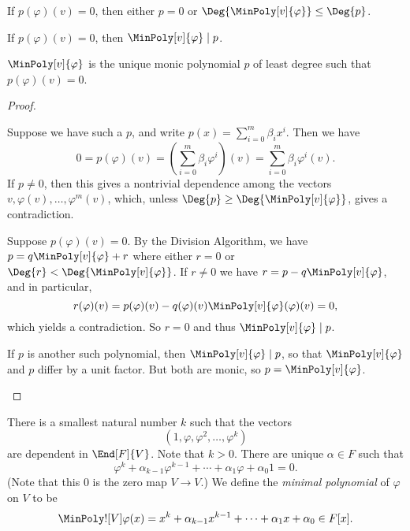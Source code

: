 \documentclass{memoir}
\begin{document}
\begin{prp} \mbox{}
\begin{enumerate*}
\item If $p(\varphi)(v) = 0$, then either $p = 0$ or $\Deg{\MinPoly[v]{\varphi}} \leq \Deg{p}$.
\item If $p(\varphi)(v) = 0$, then $\MinPoly[v]{\varphi} \mid p$.
\item $\MinPoly[v]{\varphi}$ is the unique monic polynomial $p$ of least degree such that $p(\varphi)(v) = 0$.
\end{enumerate*}
\end{prp}

\begin{proof} \mbox{}
\begin{enumerate*}
\item Suppose we have such a $p$, and write $p(x) = \sum_{i=0}^m \beta_i x^i$. Then we have \[ 0 = p(\varphi)(v) = \left( \sum_{i=0}^m \beta_i \varphi^i \right)(v) = \sum_{i=0}^m \beta_i \varphi^i(v). \] If $p \neq 0$, then this gives a nontrivial dependence among the vectors $v, \varphi(v), \ldots, \varphi^m(v)$, which, unless $\Deg{p} \geq \Deg{\MinPoly[v]{\varphi}}$, gives a contradiction.
\item Suppose $p(\varphi)(v) = 0$. By the Division Algorithm, we have $p = q\MinPoly[v]{\varphi} + r$ where either $r = 0$ or $\Deg{r} < \Deg{\MinPoly[v]{\varphi}}$. If $r \neq 0$ we have $r = p - q\MinPoly[v]{\varphi}$, and in particular, \[ r(\varphi)(v) = p(\varphi)(v) - q(\varphi)(v) \MinPoly[v]{\varphi}(\varphi)(v) = 0, \] which yields a contradiction. So $r = 0$ and thus $\MinPoly[v]{\varphi} \mid p$.
\item If $p$ is another such polynomial, then $\MinPoly[v]{\varphi} \mid p$, so that $\MinPoly[v]{\varphi}$ and $p$ differ by a unit factor. But both are monic, so $p = \MinPoly[v]{\varphi}$. \qedhere
\end{enumerate*}
\end{proof}

\begin{dfn}
There is a smallest natural number $k$ such that the vectors \[ (1, \varphi, \varphi^2, \ldots, \varphi^k) \] are dependent in $\End[F]{V}$. Note that $k>0$. There are unique $\alpha \in F$ such that \[ \varphi^k + \alpha_{k-1} \varphi^{k-1} + \cdots + \alpha_1 \varphi + \alpha_0 1 = 0. \] (Note that this 0 is the zero map $V \rightarrow V$.) We define the \emph{minimal polynomial} of $\varphi$ on $V$ to be \[ \MinPoly![V]{\varphi}(x) = x^k + \alpha_{k-1} x^{k-1} + \cdots + \alpha_1 x + \alpha_0 \in F[x]. \]
\end{dfn}
\end{document}
